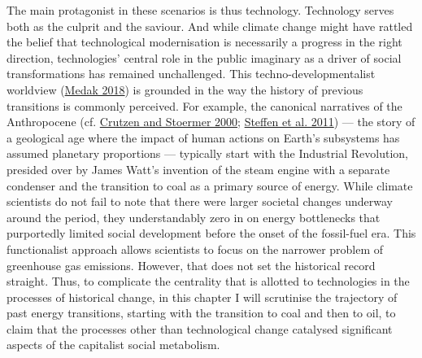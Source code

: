\documentclass[a4paper, nobind]{templates/ociamthesis}
\begin{document}
The main protagonist in these scenarios is thus technology. Technology serves both as the culprit and the saviour. And while climate change might have rattled the belief that technological modernisation is necessarily a progress in the right direction, technologies' central role in the public imaginary as a driver of social transformations has remained unchallenged. This techno-developmentalist worldview (\protect\hyperlink{ref-medak_technologies_2018}{Medak 2018}) is grounded in the way the history of previous transitions is commonly perceived. For example, the canonical narratives of the Anthropocene (cf. \protect\hyperlink{ref-crutzen_anthropocene_2000}{Crutzen and Stoermer 2000}; \protect\hyperlink{ref-steffen_anthropocene_2011}{Steffen et al. 2011}) --- the story of a geological age where the impact of human actions on Earth's subsystems has assumed planetary proportions --- typically start with the Industrial Revolution, presided over by James Watt's invention of the steam engine with a separate condenser and the transition to coal as a primary source of energy. While climate scientists do not fail to note that there were larger societal changes underway around the period, they understandably zero in on energy bottlenecks that purportedly limited social development before the onset of the fossil-fuel era. This functionalist approach allows scientists to focus on the narrower problem of greenhouse gas emissions. However, that does not set the historical record straight. Thus, to complicate the centrality that is allotted to technologies in the processes of historical change, in this chapter I will scrutinise the trajectory of past energy transitions, starting with the transition to coal and then to oil, to claim that the processes other than technological change catalysed significant aspects of the capitalist social metabolism.
\end{document}
